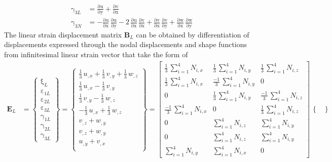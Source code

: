\begin{subequations}
\begin{align}
    \mathrm \gamma_{3L} & = \mathrm{\frac{\partial u}{\partial y}} + \mathrm{\frac{\partial v}{\partial x}}\\
    \mathrm \gamma_{3N} & = - \mathrm{\frac{\partial u}{\partial x}}\, \mathrm{\frac{\partial u}{\partial y}} - 2 \, \mathrm{\frac{ \partial u}{\partial x}}\, \mathrm{\frac{ \partial v}{\partial x}} + \mathrm{\frac{\partial v}{\partial x}}\, \mathrm{\frac{\partial v}{\partial y}} + \mathrm{\frac{\partial w}{\partial x}}\, \mathrm{\frac{\partial w}{\partial y}} 
	\end{align}
\end{subequations}
The linear strain displacement matrix $\mathbf{B}_L$ can be obtained by differentiation of displacements expressed through the nodal displacements and shape functions from infinitesimal linear strain vector that take the form of
\begin{equation}
\begin{aligned}
\mathbf{E}_L & =  \begin{Bmatrix}
\mathrm \xi_{L} \\
\mathrm \varepsilon_{1L} \\
\mathrm \varepsilon_{2L} \\
\mathrm \varepsilon_{3L} \\
\mathrm \gamma_{1L} \\
\mathrm \gamma_{2L} \\
\mathrm \gamma_{3L}\end{Bmatrix} = 
\begin{Bmatrix}
\tfrac{1}{3} \, u_{,x} + \tfrac{1}{3} \, v_{,y} + \tfrac{1}{3} \, w_{,z} \\
\tfrac{1}{3} \, u_{,x} - \tfrac{1}{3} \, v_{,y} \\
\tfrac{1}{3} \, v_{,y} - \tfrac{1}{3} \, w_{,z} \\
- \tfrac{1}{3} \, u_{,x} + \tfrac{1}{3} \, w_{,z} \\ 
v_{,z} +  w_{,y} \\ 
v_{,z} +  w_{,y} \\ 
u_{,y} +  v_{,x} \\\end{Bmatrix} = \begin{bmatrix}
\tfrac{1}{3} \, \sum\nolimits_{i=1}^4 N_{i,x}  & \tfrac{1}{3} \, \sum\nolimits_{i=1}^4 N_{i,y} & \tfrac{1}{3} \, \sum\nolimits_{i=1}^4 N_{i,z} \\
\tfrac{1}{3} \, \sum\nolimits_{i=1}^4 N_{i,x}  & \tfrac{-1}{3} \, \sum\nolimits_{i=1}^4 N_{i,y} & 0 \\ 0 & \tfrac{1}{3} \, \sum\nolimits_{i=1}^4 N_{i,y}  &  \tfrac{-1}{3} \, \sum\nolimits_{i=1}^4 N_{i,z} \\  \tfrac{-1}{3} \, \sum\nolimits_{i=1}^4 N_{i,x}  & 0 & \tfrac{1}{3} \, \sum\nolimits_{i=1}^4 N_{i,z} \\ 0 & \sum\nolimits_{i=1}^4 N_{i,z}  &  \sum\nolimits_{i=1}^4 N_{i,y} \\ 0 & \sum\nolimits_{i=1}^4 N_{i,z}  &  \sum\nolimits_{i=1}^4 N_{i,y} \\ \sum\nolimits_{i=1}^4 N_{i,y}  &  \sum\nolimits_{i=1}^4 N_{i,x} & 0 \end{bmatrix} \, \begin{Bmatrix}

\end{Bmatrix}
\end{aligned}
\end{equation}
